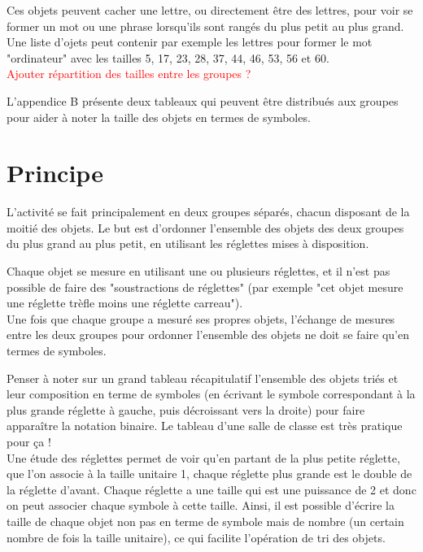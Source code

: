 \documentclass[a4paper,12pt]{scrartcl}
\begin{document}
Ces objets peuvent cacher une lettre, ou directement être des lettres, pour voir se former un mot ou une phrase lorsqu'ils sont rangés du plus petit au plus grand.
Une liste d'ojets peut contenir par exemple les lettres pour former le mot "ordinateur" avec les tailles 5, 17, 23, 28, 37, 44, 46, 53, 56 et 60.\\
\textcolor{red}{Ajouter répartition des tailles entre les groupes ?}

L'appendice B présente deux tableaux qui peuvent être distribués aux groupes pour aider à noter la taille des objets en termes de symboles.



\section{Principe}

L'activité se fait principalement en deux groupes séparés, chacun disposant de la moitié des objets.
Le but est d'ordonner l'ensemble des objets des deux groupes du plus grand au plus petit, en utilisant les réglettes mises à disposition.

Chaque objet se mesure en utilisant une ou plusieurs réglettes, et il n'est pas possible de faire des "soustractions de réglettes" (par exemple "cet objet mesure une réglette trèfle moins une réglette carreau").\\


Une fois que chaque groupe a mesuré ses propres objets, l'échange de mesures entre les deux groupes pour ordonner l'ensemble des objets ne doit se faire qu'en termes de symboles.

Penser à noter sur un grand tableau récapitulatif l'ensemble des objets triés et leur composition en terme de symboles (en écrivant le symbole correspondant à la plus grande réglette à gauche, puis décroissant vers la droite) pour faire apparaître la notation binaire. Le tableau d'une salle de classe est très pratique pour ça !\\


Une étude des réglettes permet de voir qu'en partant de la plus petite réglette, que l'on associe à la taille unitaire 1, chaque réglette plus grande est le double de la réglette d'avant. 
%
Chaque réglette a une taille qui est une puissance de 2 et donc on peut associer chaque symbole à cette taille. Ainsi, il est possible d'écrire la taille de chaque objet non pas en terme de symbole mais de nombre (un certain nombre de fois la taille unitaire), ce qui facilite l'opération de tri des objets.
\end{document}
